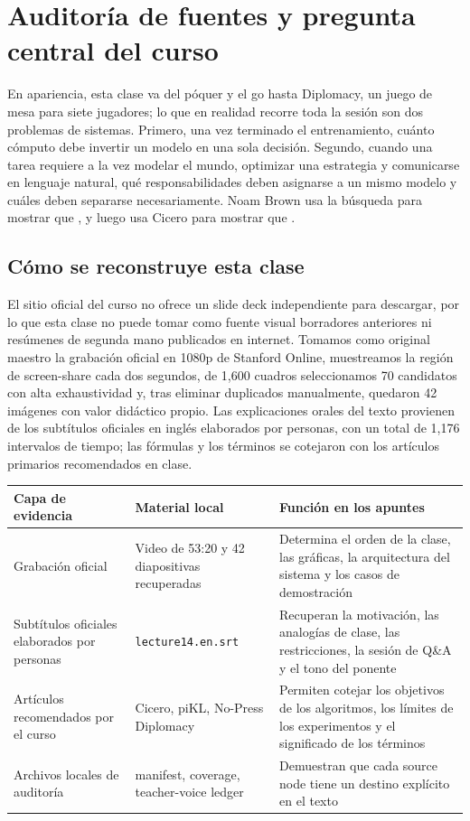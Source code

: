 \section{Auditoría de fuentes y pregunta central del curso}

En apariencia, esta clase va del póquer y el go hasta Diplomacy, un juego de mesa para siete jugadores; lo que en realidad recorre toda la sesión son dos problemas de sistemas. Primero, una vez terminado el entrenamiento, cuánto cómputo debe invertir un modelo en una sola decisión. Segundo, cuando una tarea requiere a la vez modelar el mundo, optimizar una estrategia y comunicarse en lenguaje natural, qué responsabilidades deben asignarse a un mismo modelo y cuáles deben separarse necesariamente. Noam Brown usa la búsqueda para mostrar que , y luego usa Cicero para mostrar que .

\subsection{Cómo se reconstruye esta clase}

El sitio oficial del curso no ofrece un slide deck independiente para descargar, por lo que esta clase no puede tomar como fuente visual borradores anteriores ni resúmenes de segunda mano publicados en internet. Tomamos como original maestro la grabación oficial en 1080p de Stanford Online, muestreamos la región de screen-share cada dos segundos, de 1,600 cuadros seleccionamos 70 candidatos con alta exhaustividad y, tras eliminar duplicados manualmente, quedaron 42 imágenes con valor didáctico propio. Las explicaciones orales del texto provienen de los subtítulos oficiales en inglés elaborados por personas, con un total de 1,176 intervalos de tiempo; las fórmulas y los términos se cotejaron con los artículos primarios recomendados en clase.

\begin{longtable}{L{0.22\textwidth}L{0.31\textwidth}L{0.37\textwidth}}
\toprule
Capa de evidencia & Material local & Función en los apuntes \\
\midrule
Grabación oficial & Video de 53:20 y 42 diapositivas recuperadas & Determina el orden de la clase, las gráficas, la arquitectura del sistema y los casos de demostración \\
Subtítulos oficiales elaborados por personas & \texttt{lecture14.en.srt} & Recuperan la motivación, las analogías de clase, las restricciones, la sesión de Q\&A y el tono del ponente \\
Artículos recomendados por el curso & Cicero, piKL, No-Press Diplomacy & Permiten cotejar los objetivos de los algoritmos, los límites de los experimentos y el significado de los términos \\
Archivos locales de auditoría & manifest, coverage, teacher-voice ledger & Demuestran que cada source node tiene un destino explícito en el texto \\
\bottomrule
\end{longtable}

